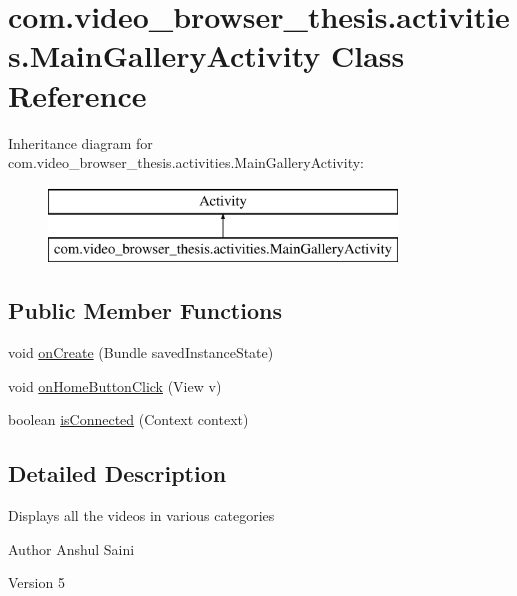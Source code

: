 \hypertarget{classcom_1_1video__browser__thesis_1_1activities_1_1_main_gallery_activity}{\section{com.\-video\-\_\-browser\-\_\-thesis.\-activities.\-Main\-Gallery\-Activity Class Reference}
\label{classcom_1_1video__browser__thesis_1_1activities_1_1_main_gallery_activity}
}
Inheritance diagram for com.\-video\-\_\-browser\-\_\-thesis.\-activities.\-Main\-Gallery\-Activity\-:\begin{figure}[H]
\begin{center}
\leavevmode
\includegraphics[height=2.000000cm]{classcom_1_1video__browser__thesis_1_1activities_1_1_main_gallery_activity}
\end{center}
\end{figure}
\subsection*{Public Member Functions}
\begin{DoxyCompactItemize}
\item 
void \hyperlink{classcom_1_1video__browser__thesis_1_1activities_1_1_main_gallery_activity_ab66dcb21324325af069e1d24a7c5c245}{on\-Create} (Bundle saved\-Instance\-State)
\item 
void \hyperlink{classcom_1_1video__browser__thesis_1_1activities_1_1_main_gallery_activity_adb4ca73673080cdf8631d6f39b2bd9b9}{on\-Home\-Button\-Click} (View v)
\item 
boolean \hyperlink{classcom_1_1video__browser__thesis_1_1activities_1_1_main_gallery_activity_a46626305fc65e1ec7e5a81002f33cdeb}{is\-Connected} (Context context)
\end{DoxyCompactItemize}


\subsection{Detailed Description}
Displays all the videos in various categories \begin{DoxyAuthor}{Author}
Anshul Saini 
\end{DoxyAuthor}
\begin{DoxyVersion}{Version}
5 
\end{DoxyVersion}


